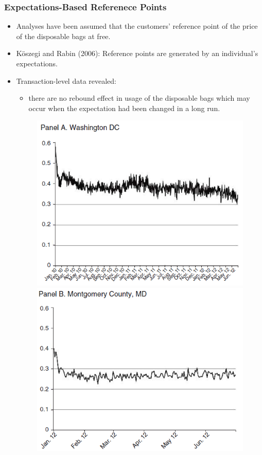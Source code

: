 \documentclass[dvipdfmx,11pt]{beamer}
\begin{document}
\begin{frame}\frametitle{Expectations-Based Referenece Points}
  \begin{itemize}
    \small
    \item Analyses have been assumed that the customers' reference point of the price of the disposable bags at free.
    \item K\"{o}szegi and Rabin (2006): Reference points are generated by an individual's expectations.
    \item Transaction-level data revealed:
    \begin{itemize}
      \footnotesize
      \item there are no rebound effect in usage of the disposable bags which may occur when the expectation had been changed in a long run.
    \end{itemize}
    \begin{figure}[ht]
      \centering
      \includegraphics[scale = .4]{0807tanji/F5A}
      \includegraphics[scale = .4]{0807tanji/F5B}
    \end{figure}
  \end{itemize}
\end{frame}
\end{document}
